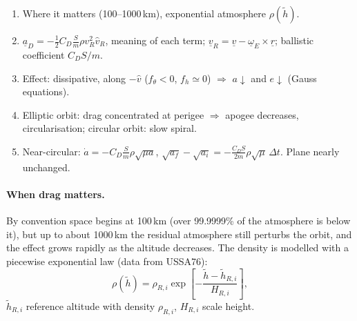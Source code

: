 \begin{outline}
\begin{enumerate}
\item Where it matters (100--1000\,km), exponential atmosphere $\rho(\tilde h)$.
\item $\underline a_D=-\frac12C_D\frac{S}{m}\rho v_R^2\hat v_R$, meaning of each term; $\underline v_R=\underline v-\underline\omega_E\times\underline r$; ballistic coefficient $C_DS/m$.
\item Effect: dissipative, along $-\hat v$ ($f_\theta<0$, $f_h\simeq0$) $\Rightarrow$ $a\downarrow$ and $e\downarrow$ (Gauss equations).
\item Elliptic orbit: drag concentrated at perigee $\Rightarrow$ apogee decreases, circularisation; circular orbit: slow spiral.
\item Near-circular: $\dot a=-C_D\frac Sm\rho\sqrt{\mu a}$, $\sqrt{a_f}-\sqrt{a_i}=-\frac{C_DS}{2m}\rho\sqrt\mu\,\Delta t$. Plane nearly unchanged.
\end{enumerate}
\end{outline}

\answer
\paragraph{When drag matters.} By convention space begins at 100\,km (over 99.9999\% of the atmosphere is below it), but up to about
1000\,km the residual atmosphere still perturbs the orbit, and the effect grows rapidly as the altitude decreases. The density is
modelled with a piecewise exponential law (data from USSA76):
\begin{equation}
\rho(\tilde{h})=\rho_{R,i}\exp\!\left[-\frac{\tilde{h}-\tilde{h}_{R,i}}{H_{R,i}}\right],
\end{equation}
$\tilde h_{R,i}$ reference altitude with density $\rho_{R,i}$, $H_{R,i}$ scale height.


